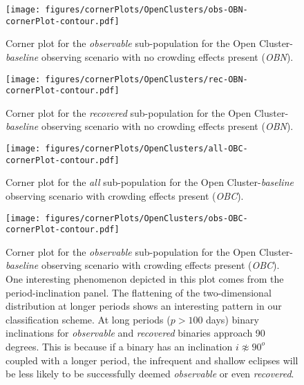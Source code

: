 \documentclass[twocolumn]{aastex63}
\begin{document}
\begin{figure}
    \centering
    \texttt{[image: figures/cornerPlots/OpenClusters/obs-OBN-cornerPlot-contour.pdf]}
    \caption{Corner plot for the \textit{observable} sub-population for the Open Cluster-\textit{baseline} observing scenario with no crowding effects present (\textit{OBN}).}
    \label{fig:obn-obs-corner-plot-appendix}
\end{figure}\clearpage

\begin{figure}
    \centering
    \texttt{[image: figures/cornerPlots/OpenClusters/rec-OBN-cornerPlot-contour.pdf]}
    \caption{Corner plot for the \textit{recovered} sub-population for the Open Cluster-\textit{baseline} observing scenario with no crowding effects present (\textit{OBN}).}
    \label{fig:obn-rec-corner-plot-appendix}
\end{figure}\clearpage

\begin{figure}
    \centering
    \texttt{[image: figures/cornerPlots/OpenClusters/all-OBC-cornerPlot-contour.pdf]}
    \caption{Corner plot for the \textit{all} sub-population for the Open Cluster-\textit{baseline} observing scenario with crowding effects present (\textit{OBC}).}
    \label{fig:obc-all-corner-plot-appendix}
\end{figure}\clearpage

\begin{figure}
    \centering
    \texttt{[image: figures/cornerPlots/OpenClusters/obs-OBC-cornerPlot-contour.pdf]}
    \caption{Corner plot for the \textit{observable} sub-population for the Open Cluster-\textit{baseline} observing scenario with crowding effects present (\textit{OBC}). One interesting phenomenon depicted in this plot comes from the period-inclination panel. The flattening of the two-dimensional distribution at longer periods shows an interesting pattern in our classification scheme. At long periods ($p > 100$ days) binary inclinations for \textit{observable} and \textit{recovered} binaries approach 90 degrees. This is because if a binary has an inclination $i \not\approx 90^o$ coupled with a longer period, the infrequent and shallow eclipses will be less likely to be successfully deemed \textit{observable} or even \textit{recovered}.}
    \label{fig:obc-obs-corner-plot-appendix}
\end{figure}\clearpage
\end{document}
